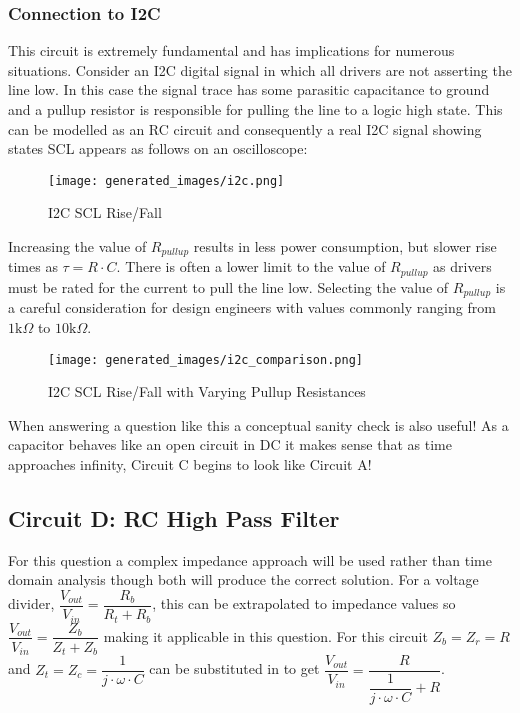 \documentclass[main.tex]{subfiles}
\begin{document}
\subsubsection{Connection to I2C}
This circuit is extremely fundamental and has implications for numerous situations. Consider an I2C digital signal in which all drivers are not asserting the line low. In this case the signal trace has some parasitic capacitance to ground and a pullup resistor is responsible for pulling the line to a logic high state. This can be modelled as an RC circuit and consequently a real I2C signal showing states SCL appears as follows on an oscilloscope:

\begin{figure}[H]
    \centering
    \texttt{[image: generated\_images/i2c.png]}
    \caption{I2C SCL Rise/Fall}
    \label{fig:i2c}
\end{figure}

\noindent Increasing the value of $R_{pullup}$ results in less power consumption, but slower rise times as $\tau = R \cdot C$. There is often a lower limit to the value of $R_{pullup}$ as drivers must be rated for the current to pull the line low. Selecting the value of $R_{pullup}$ is a careful consideration for design engineers with values commonly ranging from $1 \text{k} \Omega$ to $10 \text{k} \Omega$.

\begin{figure}[H]
    \centering
    \texttt{[image: generated\_images/i2c\_comparison.png]}
    \caption{I2C SCL Rise/Fall with Varying Pullup Resistances}
    \label{fig:i2c_comparison}
\end{figure}

\noindent When answering a question like this a conceptual sanity check is also useful! As a capacitor behaves like an open circuit in DC it makes sense that as time approaches infinity, Circuit C begins to look like Circuit A! 

\subsection{Circuit D: RC High Pass Filter}
For this question a complex impedance approach will be used rather than time domain analysis though both will produce the correct solution. For a voltage divider, $\dfrac{V_{out}}{V_{in}} = \dfrac{R_b}{R_t + R_b}$, this can be extrapolated to impedance values so $\dfrac{V_{out}}{V_{in}} = \dfrac{Z_b}{Z_t + Z_b}$ making it applicable in this question. For this circuit $Z_b = Z_r = R$ and $Z_t = Z_c = \dfrac{1}{j \cdot \omega \cdot C}$ can be substituted in to get $\dfrac{V_{out}}{V_{in}} = \dfrac{R}{\dfrac{1}{j \cdot \omega \cdot C} + R}$. \newline
\end{document}
